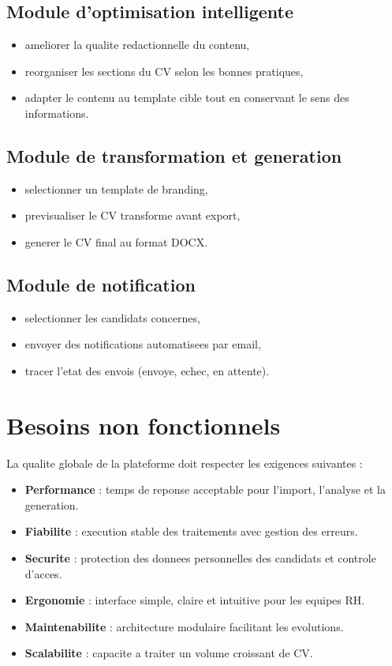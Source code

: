 \subsection{Module d'optimisation intelligente}
\begin{itemize}[label=--]
    \item ameliorer la qualite redactionnelle du contenu,
    \item reorganiser les sections du CV selon les bonnes pratiques,
    \item adapter le contenu au template cible tout en conservant le sens des informations.
\end{itemize}

\subsection{Module de transformation et generation}
\begin{itemize}[label=--]
    \item selectionner un template de branding,
    \item previsualiser le CV transforme avant export,
    \item generer le CV final au format DOCX.
\end{itemize}

\subsection{Module de notification}
\begin{itemize}[label=--]
    \item selectionner les candidats concernes,
    \item envoyer des notifications automatisees par email,
    \item tracer l'etat des envois (envoye, echec, en attente).
\end{itemize}

\section{Besoins non fonctionnels}
La qualite globale de la plateforme doit respecter les exigences suivantes :
\begin{itemize}[label=--]
    \item \textbf{Performance} : temps de reponse acceptable pour l'import, l'analyse et la generation.
    \item \textbf{Fiabilite} : execution stable des traitements avec gestion des erreurs.
    \item \textbf{Securite} : protection des donnees personnelles des candidats et controle d'acces.
    \item \textbf{Ergonomie} : interface simple, claire et intuitive pour les equipes RH.
    \item \textbf{Maintenabilite} : architecture modulaire facilitant les evolutions.
    \item \textbf{Scalabilite} : capacite a traiter un volume croissant de CV.
\end{itemize}

